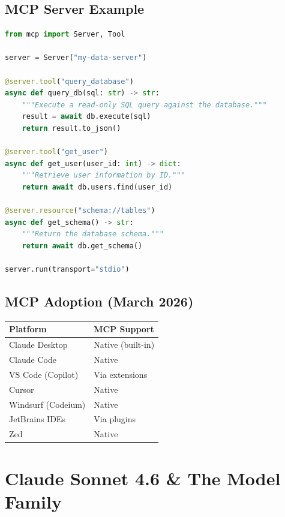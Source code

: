 \documentclass[11pt,a4paper]{article}
\begin{document}
\subsection{MCP Server Example}

\begin{lstlisting}[language=Python, caption={Simple MCP Server (Python)}]
from mcp import Server, Tool

server = Server("my-data-server")

@server.tool("query_database")
async def query_db(sql: str) -> str:
    """Execute a read-only SQL query against the database."""
    result = await db.execute(sql)
    return result.to_json()

@server.tool("get_user")  
async def get_user(user_id: int) -> dict:
    """Retrieve user information by ID."""
    return await db.users.find(user_id)

@server.resource("schema://tables")
async def get_schema() -> str:
    """Return the database schema."""
    return await db.get_schema()

server.run(transport="stdio")
\end{lstlisting}

\subsection{MCP Adoption (March 2026)}

\begin{center}
\begin{tabular}{ll}
\toprule
\textbf{Platform} & \textbf{MCP Support} \\
\midrule
Claude Desktop & Native (built-in) \\
Claude Code & Native \\
VS Code (Copilot) & Via extensions \\
Cursor & Native \\
Windsurf (Codeium) & Native \\
JetBrains IDEs & Via plugins \\
Zed & Native \\
\bottomrule
\end{tabular}
\end{center}

\section{Claude Sonnet 4.6 \& The Model Family}
\end{document}
